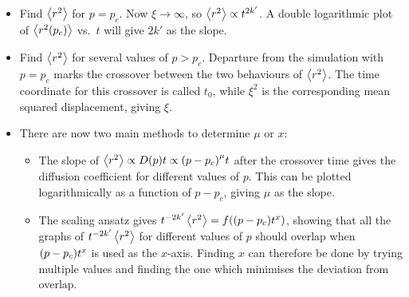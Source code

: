 \documentclass[11pt,british,a4paper]{report}
\begin{document}
\begin{itemize}
    \item Find \(\ev{r^2}\) for \(p=p_c\). Now \(\xi\to\infty\), so \(\ev{r^2}\propto t^{2k'}\). A double logarithmic plot of \(\ev{r^2(p_c)}\) vs.\ \(t\) will give \(2k'\) as the slope.
    \item Find \(\ev{r^2}\) for several values of \(p>p_c\). Departure from the simulation with \(p=p_c\) marks the crossover between the two behaviours of \(\ev{r^2}\). The time coordinate for this crossover is called \(t_0\), while \(\xi^2\) is the corresponding mean squared displacement, giving \(\xi\).
    \item There are now two main methods to determine \(\mu\) or \(x\):
    \begin{itemize}
        \item The slope of \(\ev{r^2}\propto D(p)t \propto \qty(p-p_c)^\mu t\) after the crossover time gives the diffusion coefficient for different values of \(p\). This can be plotted logarithmically as a function of \(p-p_c\), giving \(\mu\) as the slope.
        \item The scaling ansatz gives \(t^{-2k'}\ev{r^2}=f\qty(\qty(p-p_c)t^x)\), showing that all the graphs of \(t^{-2k'}\ev{r^2}\) for different values of \(p\) should overlap when \(\qty(p-p_c)t^x\) is used as the \(x\)-axis. Finding \(x\) can therefore be done by trying multiple values and finding the one which minimises the deviation from overlap.
    \end{itemize}
\end{itemize}
\end{document}

